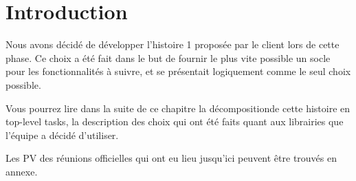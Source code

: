 \section{Introduction}
Nous avons décidé de développer l'histoire 1 proposée par le client 
lors de cette phase. Ce choix a été fait dans le but de fournir le 
plus vite possible un socle pour les fonctionnalités à suivre, et se 
présentait logiquement comme le seul choix possible.

Vous pourrez lire dans la suite de ce chapitre la décompositionde cette 
histoire en top-level tasks, la description des choix qui ont été 
faits quant aux librairies que l'équipe a décidé d'utiliser. 

Les PV des réunions officielles qui ont eu lieu jusqu'ici peuvent être 
trouvés en annexe.
